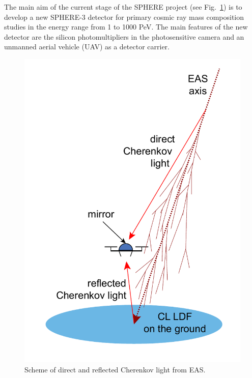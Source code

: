 \documentclass[a4paper]{jpconf}
\begin{document}
The main aim of the current stage of the SPHERE project (see Fig.~\ref{fig:DirectCL}) is to develop a new SPHERE-3 detector for primary cosmic ray mass composition studies in the energy range from 1 to 1000 PeV. The main features of the new detector are the silicon photomultipliers in the photosensitive camera and an unmanned aerial vehicle (UAV) as a detector carrier. 
\begin{figure}
    \begin{minipage}[b]{.45\textwidth}
    \centering 
        \includegraphics[height=.365\textheight]{DirectCL.pdf}
        \caption{Scheme of direct and reflected Cherenkov light from EAS.}
        \label{fig:DirectCL}
    \end{minipage}
    \hfill
    \begin{minipage}[b]{.52\textwidth}

\end{minipage}
\end{figure}
\end{document}
